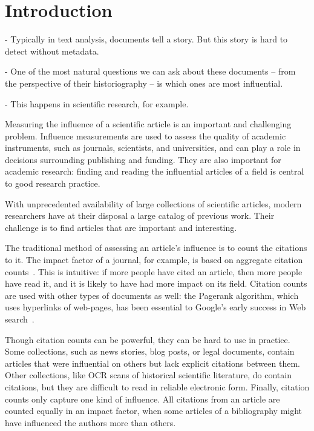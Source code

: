 \section{Introduction}

- Typically in text analysis, documents tell a story.  But this story is hard to detect without metadata.

- One of the most natural questions we can ask about these documents -- from the perspective of their historiography -- is which ones are most influential.

- This happens in scientific research, for example.

Measuring the influence of a scientific article is an important and
challenging problem.  Influence measurements are used to assess the
quality of academic instruments, such as journals, scientists, and
universities, and can play a role in decisions surrounding publishing
and funding.  They are also important for academic research: finding
and reading the influential articles of a field is central to good
research practice.

With unprecedented availability of large collections of scientific
articles, modern researchers have at their disposal a large catalog of
previous work.  Their challenge is to find articles that are important
and interesting.

The traditional method of assessing an article's influence is to count
the citations to it.  The impact factor of a journal, for example, is
based on aggregate citation counts~\cite{garfield:2002}.  This is
intuitive: if more people have cited an article, then more people have
read it, and it is likely to have had more impact on its field.
Citation counts are used with other types of documents as well: the
Pagerank algorithm, which uses hyperlinks of web-pages, has been
essential to Google's early success in Web search~\cite{brin:1998}.

Though citation counts can be powerful, they can be hard to use in
practice.  Some collections, such as news stories, blog posts, or
legal documents, contain articles that were influential on others but
lack explicit citations between them.  Other collections, like OCR
scans of historical scientific literature, do contain citations, but
they are difficult to read in reliable electronic form.  Finally,
citation counts only capture one kind of influence.  All citations
from an article are counted equally in an impact factor, when some
articles of a bibliography might have influenced the authors more than
others.

